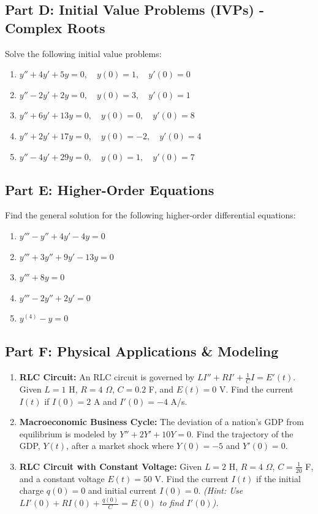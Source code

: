 \documentclass[11pt]{article}
\begin{document}
\subsection*{Part D: Initial Value Problems (IVPs) - Complex Roots}
Solve the following initial value problems:
\begin{enumerate}[label=\textbf{\arabic*.}, resume]
    \item $y'' + 4y' + 5y = 0, \quad y(0) = 1, \quad y'(0) = 0$
    \item $y'' - 2y' + 2y = 0, \quad y(0) = 3, \quad y'(0) = 1$
    \item $y'' + 6y' + 13y = 0, \quad y(0) = 0, \quad y'(0) = 8$
    \item $y'' + 2y' + 17y = 0, \quad y(0) = -2, \quad y'(0) = 4$
    \item $y'' - 4y' + 29y = 0, \quad y(0) = 1, \quad y'(0) = 7$
\end{enumerate}

\subsection*{Part E: Higher-Order Equations}
Find the general solution for the following higher-order differential equations:
\begin{enumerate}[label=\textbf{\arabic*.}, resume]
    \item $y''' - y'' + 4y' - 4y = 0$
    \item $y''' + 3y'' + 9y' - 13y = 0$
    \item $y''' + 8y = 0$
    \item $y''' - 2y'' + 2y' = 0$
    \item $y^{(4)} - y = 0$
\end{enumerate}

\subsection*{Part F: Physical Applications \& Modeling}
\begin{enumerate}[label=\textbf{\arabic*.}, resume]
    \item \textbf{RLC Circuit:} An RLC circuit is governed by $LI'' + RI' + \frac{1}{C}I = E'(t)$. Given $L = 1$ H, $R = 4$ $\Omega$, $C = 0.2$ F, and $E(t) = 0$ V. Find the current $I(t)$ if $I(0) = 2$ A and $I'(0) = -4$ A/s.
    \item \textbf{Macroeconomic Business Cycle:} The deviation of a nation's GDP from equilibrium is modeled by $Y'' + 2Y' + 10Y = 0$. Find the trajectory of the GDP, $Y(t)$, after a market shock where $Y(0) = -5$ and $Y'(0) = 0$.
    \item \textbf{RLC Circuit with Constant Voltage:} Given $L = 2$ H, $R = 4$ $\Omega$, $C = \frac{1}{20}$ F, and a constant voltage $E(t) = 50$ V. Find the current $I(t)$ if the initial charge $q(0) = 0$ and initial current $I(0) = 0$. \textit{(Hint: Use $LI'(0) + RI(0) + \frac{q(0)}{C} = E(0)$ to find $I'(0)$).}
\end{enumerate}
\end{document}
